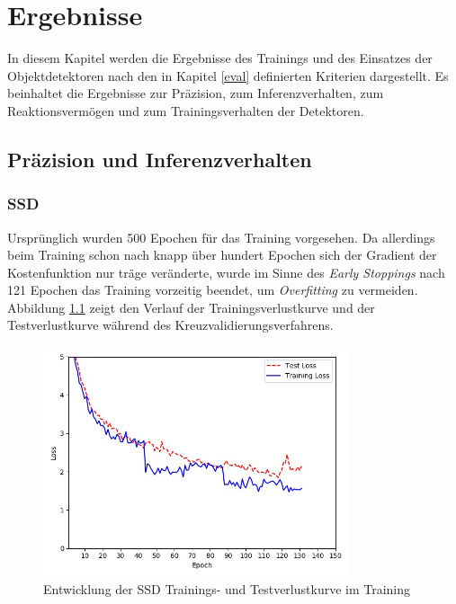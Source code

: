 \chapter{Ergebnisse} \label{evaluation}

In diesem Kapitel werden die Ergebnisse des Trainings und des Einsatzes der Objektdetektoren nach den in Kapitel \ref{eval} definierten Kriterien dargestellt. Es beinhaltet die Ergebnisse zur Präzision, zum Inferenzverhalten, zum Reaktionsvermögen und zum Trainingsverhalten der Detektoren.

\section{Präzision und Inferenzverhalten}

\subsection*{SSD}

Ursprünglich wurden 500 Epochen für das Training vorgesehen. Da allerdings beim Training schon nach knapp über hundert Epochen sich der Gradient der Kostenfunktion nur träge veränderte, wurde im Sinne des \textit{Early Stoppings} nach 121 Epochen das Training vorzeitig beendet, um \textit{Overfitting} zu vermeiden. Abbildung \ref{ssdloss} zeigt den Verlauf der Trainingsverlustkurve und der Testverlustkurve während des Kreuzvalidierungsverfahrens.

\begin{figure}[H]
	\begin{center}
		\includegraphics[width=9cm]{Bilder/ssdloss.jpeg} 
		\caption{Entwicklung der SSD Trainings- und Testverlustkurve im Training}
		\label{ssdloss}
	\end{center}
\end{figure}

